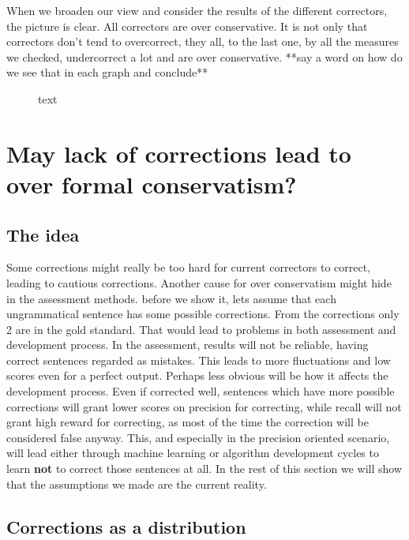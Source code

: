 \documentclass[11pt]{article}
\begin{document}
When we broaden our view and consider the results of the different
correctors, the picture is clear. All correctors are over conservative.
It is not only that correctors don't tend to overcorrect, they all,
to the last one, by all the measures we checked, undercorrect a lot
and are over conservative. {*}{*}say a word on how do we see that
in each graph and conclude{*}{*}

\begin{figure}
text
\end{figure}


\section{May lack of corrections lead to over formal conservatism?\label{sec:May-lack-of}}

\subsection{The idea}

Some corrections might really be too hard for current correctors to
correct, leading to cautious corrections. Another cause for over conservatism
might hide in the assessment methods. before we show it, lets assume
that each ungrammatical sentence has some possible corrections. From
the corrections only 2 are in the gold standard. That would lead to
problems in both assessment and development process. In the assessment,
results will not be reliable, having correct sentences regarded as mistakes. This leads to more fluctuations and low scores even for a perfect output.
Perhaps less obvious will be how it affects the development
process. Even if corrected well, sentences which have more possible
corrections will grant lower scores on precision for correcting, while recall will not grant high reward for correcting, as most of the time the correction will be considered false anyway. This, and especially in the precision oriented scenario, will lead either through
machine learning or algorithm development cycles to learn \textbf{not} to correct
those sentences at all. In the rest of this section we will show that
the assumptions we made are the current reality.

\subsection{Corrections as a distribution}
\end{document}
